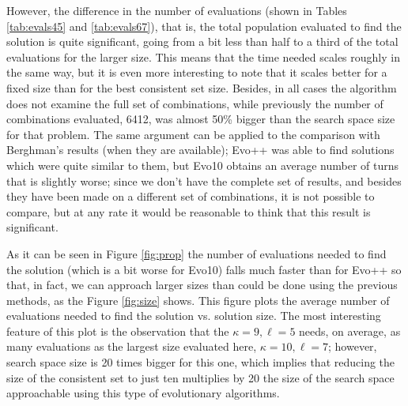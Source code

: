 \documentclass[conference]{IEEEtran}
\begin{document}
However, the difference in the
number of evaluations (shown in Tables  \ref{tab:evals45} and \ref{tab:evals67}), that is, the total population evaluated to find
the solution is quite significant, going from a bit less than half to
a third of the total evaluations for the larger size. This means that
the time needed scales roughly in the same way, but it is even more
interesting to note that it scales better for a fixed size than for
the best consistent set size. Besides, in all cases the algorithm does
not examine the full set of combinations, while previously the number
of combinations evaluated, 6412, was almost 50\% bigger than the search
space size for that problem. The same argument can be applied to the
comparison with Berghman's results (when they are available); Evo++
was able to find solutions which were quite similar to them, but Evo10
obtains an average number of turns that is slightly worse; since we
don't have the complete set of results, and besides they have been
made on a different set of combinations, it is not possible to
compare, but at any rate it would be reasonable to think that this
result is significant. 

 As it can be seen in Figure \ref{fig:prop} the number of evaluations needed to find the solution (which is a bit worse for Evo10) 
falls much faster than for Evo++ so that, in fact, we can approach larger sizes than could be done using the previous methods, as the Figure
\ref{fig:size} shows. This figure plots the average number of evaluations needed to find the solution vs. solution size. The most interesting feature of
this plot is the observation that the $\kappa=9,\ell=5$ needs, on
average, as many evaluations as the largest size evaluated here,
$\kappa=10,\ell=7$; however, search space size is 20 times bigger for
this one, which implies that reducing the size of the consistent set
to just ten  multiplies by 20 the size of the search space
approachable using this type of evolutionary algorithms. 
\end{document}
